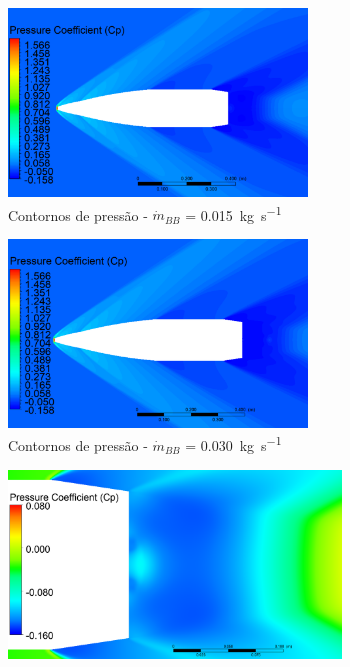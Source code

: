 
\begin{figure}[!ht]
	\centering
	\begin{subfigure}[b]{0.47\textwidth} %
        \centering
        \includegraphics[height=5cm,width=\textwidth]{contorno-pressao-2306-vazao-0015-1pol.png}
        \caption{Contornos de pressão - \(\Dot{m}_{BB}\) = \qty{0,015}{\kilogram\per\second}}
        \label{fig:contorno-pressao-bb-1pol-vazao0015}
    \end{subfigure}
    \hfill
    \begin{subfigure}[b]{0.47\textwidth} %
        \centering
        \includegraphics[height=5cm,width=\textwidth]{contorno-pressao-2306-vazao-0030-1pol.png}
        \caption{Contornos de pressão - \(\Dot{m}_{BB}\) = \qty{0,030}{\kilogram\per\second}}
        \label{fig:contorno-pressao-bb-1pol-vazao0030}
    \end{subfigure}
    \hfill
    \begin{subfigure}[b]{0.47\textwidth} %
        \centering
        \includegraphics[height=5cm,width=\textwidth]{coeficientepressao-vazao0015-temp2306-diam1pol.png}

\end{subfigure}
\end{figure}
